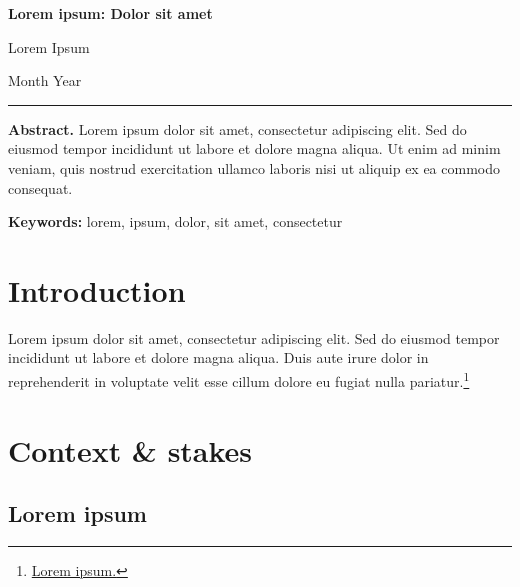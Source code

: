 \documentclass[11pt]{article}
\newcommand{\PaperTitle}{Lorem ipsum: Dolor sit amet}
\newcommand{\PaperAuthor}{Lorem Ipsum}
\newcommand{\PaperDate}{Month Year}
\newcommand{\PaperKeywords}{lorem, ipsum, dolor, sit amet, consectetur}
\newcommand{\PaperAbstract}{%
  Lorem ipsum dolor sit amet, consectetur adipiscing elit. Sed do eiusmod tempor incididunt ut labore et dolore magna aliqua. Ut enim ad minim veniam, quis nostrud exercitation ullamco laboris nisi ut aliquip ex ea commodo consequat.%
}
\begin{document}
\thispagestyle{plain}
\suppressfloats[t]

\begingroup
\setlength{\parskip}{0pt}
{\centering
  \Large\textbf{\PaperTitle}\par
  \vspace{0.3em}
  \normalsize\PaperAuthor\par
  \vspace{0.1em}
  \PaperDate\par
}
\vspace{0.3em}
\noindent\rule{\textwidth}{0.4pt}\par
\vspace{1em}
\noindent\textbf{Abstract.} \PaperAbstract\par
\vspace{0.5em}
\noindent\textbf{Keywords:} \PaperKeywords\par
\vspace{1em}
\endgroup

\section*{Introduction}

Lorem ipsum dolor sit amet, consectetur adipiscing elit. Sed do eiusmod tempor incididunt ut labore et dolore magna aliqua. Duis aute irure dolor in reprehenderit in voluptate velit esse cillum dolore eu fugiat nulla pariatur.\footnote{\href{https://example.com/}{Lorem ipsum.}}

\lipsum[2]

\section{Context \& stakes}

\subsection{Lorem ipsum}
\end{document}
